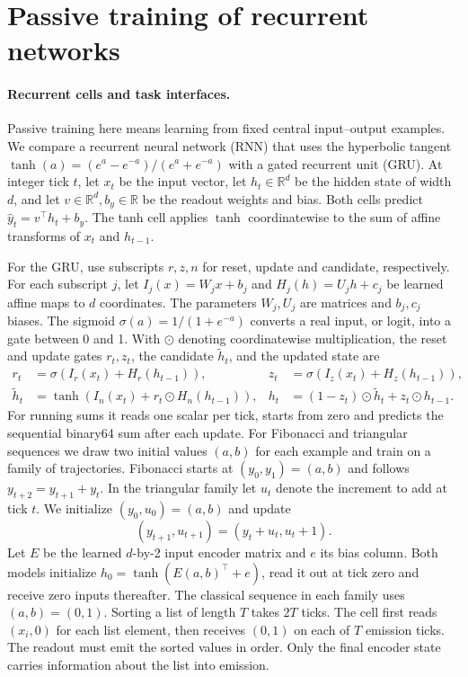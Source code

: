 \section{Passive training of recurrent networks}\label{app:passive-rnn}

\paragraph{Recurrent cells and task interfaces.}
Passive training here means learning from fixed central input--output examples. We compare a recurrent neural network (RNN) that uses the hyperbolic tangent \(\tanh(a)=(e^a-e^{-a})/(e^a+e^{-a})\) with a gated recurrent unit (GRU). At integer tick \(t\), let \(x_t\) be the input vector, let \(h_t\in\mathbb R^d\) be the hidden state of width \(d\), and let \(v\in\mathbb R^d,b_y\in\mathbb R\) be the readout weights and bias. Both cells predict \(\hat y_t=v^\top h_t+b_y\). The tanh cell applies \(\tanh\) coordinatewise to the sum of affine transforms of \(x_t\) and \(h_{t-1}\).

For the GRU, use subscripts \(r,z,n\) for reset, update and candidate, respectively. For each subscript \(j\), let \(I_j(x)=W_jx+b_j\) and \(H_j(h)=U_jh+c_j\) be learned affine maps to \(d\) coordinates. The parameters \(W_j,U_j\) are matrices and \(b_j,c_j\) biases. The sigmoid \(\sigma(a)=1/(1+e^{-a})\) converts a real input, or logit, into a gate between 0 and 1. With \(\odot\) denoting coordinatewise multiplication, the reset and update gates \(r_t,z_t\), the candidate \(\tilde h_t\), and the updated state are
\[
\begin{aligned}
 r_t&=\sigma(I_r(x_t)+H_r(h_{t-1})), &z_t&=\sigma(I_z(x_t)+H_z(h_{t-1})),\\
 \tilde h_t&=\tanh(I_n(x_t)+r_t\odot H_n(h_{t-1})),&
 h_t&=(1-z_t)\odot\tilde h_t+z_t\odot h_{t-1}.
\end{aligned}
\]
For running sums it reads one scalar per tick, starts from zero and predicts the sequential binary64 sum after each update. For Fibonacci and triangular sequences we draw two initial values \((a,b)\) for each example and train on a family of trajectories. Fibonacci starts at \((y_0,y_1)=(a,b)\) and follows \(y_{t+2}=y_{t+1}+y_t\). In the triangular family let \(u_t\) denote the increment to add at tick \(t\). We initialize \((y_0,u_0)=(a,b)\) and update
\[
          (y_{t+1},u_{t+1})=(y_t+u_t,u_t+1).
\]
Let \(E\) be the learned \(d\)-by-2 input encoder matrix and \(e\) its bias column. Both models initialize \(h_0=\tanh(E(a,b)^\top+e)\), read it out at tick zero and receive zero inputs thereafter. The classical sequence in each family uses \((a,b)=(0,1)\). Sorting a list of length \(T\) takes \(2T\) ticks. The cell first reads \((x_i,0)\) for each list element, then receives \((0,1)\) on each of \(T\) emission ticks. The readout must emit the sorted values in order. Only the final encoder state carries information about the list into emission.

